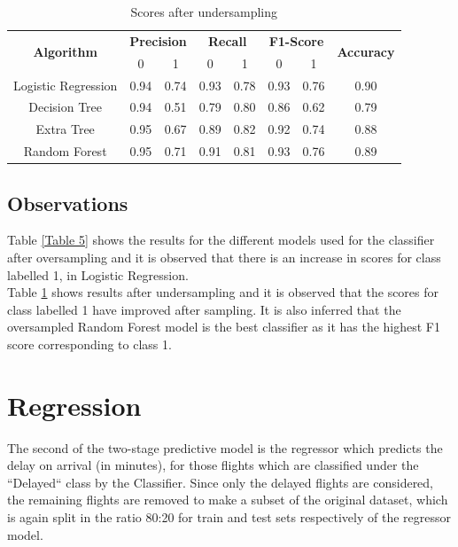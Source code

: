 \documentclass[12pt]{article}
\begin{document}
\begin{table}[H]
\begin{center}
\caption{Scores after undersampling}
\begin{tabular}{ |c|c|c|c|c|c|c|c| }
\hline
 \multirow{2}{*}{\textbf{Algorithm}} & \multicolumn{2}{c|}{\textbf{Precision}} & \multicolumn{2}{c|}{\textbf{Recall}} & \multicolumn{2}{c|}{\textbf{F1-Score}} & \multirow{2}{*}{\textbf{Accuracy}} \\
 \cline{2-7}
        & 0 & 1 & 0 & 1 & 0 & 1 & \\
 \hline
 Logistic Regression & 0.94 & 0.74 & 0.93 & 0.78 & 0.93 & 0.76 & 0.90\\
 \hline
 Decision Tree & 0.94 & 0.51 & 0.79 & 0.80 & 0.86 & 0.62 &  0.79\\
 \hline
 Extra Tree & 0.95 & 0.67 & 0.89 & 0.82 & 0.92 & 0.74 & 0.88\\
 \hline
 Random Forest & 0.95 & 0.71 & 0.91 & 0.81 & 0.93 & 0.76 & 0.89\\
\hline
\end{tabular}
\label{Table 6}
\end{center}
\end{table}
\subsection{Observations}
Table \ref{Table 5} shows the results for the different models used for the classifier after oversampling and it is observed that there is an increase in scores for class labelled 1, in Logistic Regression.\\
Table \ref{Table 6} shows results after undersampling and it is observed that the scores for class labelled 1 have improved after sampling. It is also inferred that the oversampled Random Forest model is the best classifier as it has the highest F1 score corresponding to class 1.

\section{Regression}
The second of the two-stage predictive model is the regressor which predicts the delay on arrival (in minutes), for those flights which are classified under the ``Delayed`` class by the Classifier. Since only the delayed flights are considered, the remaining flights are removed to make a subset of the original dataset,  which is again split in the ratio 80:20 for train and test sets respectively of the regressor model.\\
\end{document}
